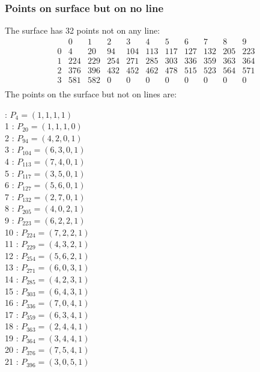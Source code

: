 \documentclass{article}
\begin{document}
{\subsubsection*{Points on surface but on no line}
The surface has 32 points not on any line:\\
$$
\begin{array}{r|*{10}{r}}
 & 0 & 1 & 2 & 3 & 4 & 5 & 6 & 7 & 8 & 9\\
\hline
0 & 4 & 20 & 94 & 104 & 113 & 117 & 127 & 132 & 205 & 223\\
1 & 224 & 229 & 254 & 271 & 285 & 303 & 336 & 359 & 363 & 364\\
2 & 376 & 396 & 432 & 452 & 462 & 478 & 515 & 523 & 564 & 571\\
3 & 581 & 582 & 0 & 0 & 0 & 0 & 0 & 0 & 0 & 0\\
\end{array}
$$
The points on the surface but not on lines are:\\
\begin{multicols}{2}
 : $P_{4}=( 1, 1, 1, 1 )$\\
1 : $P_{20}=( 1, 1, 1, 0 )$\\
2 : $P_{94}=( 4, 2, 0, 1 )$\\
3 : $P_{104}=( 6, 3, 0, 1 )$\\
4 : $P_{113}=( 7, 4, 0, 1 )$\\
5 : $P_{117}=( 3, 5, 0, 1 )$\\
6 : $P_{127}=( 5, 6, 0, 1 )$\\
7 : $P_{132}=( 2, 7, 0, 1 )$\\
8 : $P_{205}=( 4, 0, 2, 1 )$\\
9 : $P_{223}=( 6, 2, 2, 1 )$\\
10 : $P_{224}=( 7, 2, 2, 1 )$\\
11 : $P_{229}=( 4, 3, 2, 1 )$\\
12 : $P_{254}=( 5, 6, 2, 1 )$\\
13 : $P_{271}=( 6, 0, 3, 1 )$\\
14 : $P_{285}=( 4, 2, 3, 1 )$\\
15 : $P_{303}=( 6, 4, 3, 1 )$\\
16 : $P_{336}=( 7, 0, 4, 1 )$\\
17 : $P_{359}=( 6, 3, 4, 1 )$\\
18 : $P_{363}=( 2, 4, 4, 1 )$\\
19 : $P_{364}=( 3, 4, 4, 1 )$\\
20 : $P_{376}=( 7, 5, 4, 1 )$\\
21 : $P_{396}=( 3, 0, 5, 1 )$\\

\end{multicols}}
\end{document}
